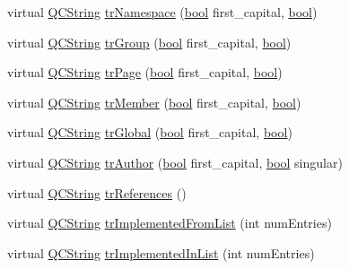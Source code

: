\begin{DoxyCompactItemize}
\item 
virtual \hyperlink{class_q_c_string}{Q\+C\+String} \hyperlink{class_translator_hungarian_a5251cff6b99f7682a9e735ae12f7548e}{tr\+Namespace} (\hyperlink{qglobal_8h_a1062901a7428fdd9c7f180f5e01ea056}{bool} first\+\_\+capital, \hyperlink{qglobal_8h_a1062901a7428fdd9c7f180f5e01ea056}{bool})
\item 
virtual \hyperlink{class_q_c_string}{Q\+C\+String} \hyperlink{class_translator_hungarian_a89dc6690b8c126f0573995077f5c7885}{tr\+Group} (\hyperlink{qglobal_8h_a1062901a7428fdd9c7f180f5e01ea056}{bool} first\+\_\+capital, \hyperlink{qglobal_8h_a1062901a7428fdd9c7f180f5e01ea056}{bool})
\item 
virtual \hyperlink{class_q_c_string}{Q\+C\+String} \hyperlink{class_translator_hungarian_ad8f96c9682cb2ced516615701264a06f}{tr\+Page} (\hyperlink{qglobal_8h_a1062901a7428fdd9c7f180f5e01ea056}{bool} first\+\_\+capital, \hyperlink{qglobal_8h_a1062901a7428fdd9c7f180f5e01ea056}{bool})
\item 
virtual \hyperlink{class_q_c_string}{Q\+C\+String} \hyperlink{class_translator_hungarian_a0c91ef506aa413a1d2bd034d9ce3fea1}{tr\+Member} (\hyperlink{qglobal_8h_a1062901a7428fdd9c7f180f5e01ea056}{bool} first\+\_\+capital, \hyperlink{qglobal_8h_a1062901a7428fdd9c7f180f5e01ea056}{bool})
\item 
virtual \hyperlink{class_q_c_string}{Q\+C\+String} \hyperlink{class_translator_hungarian_a3d388917e2cea7b7aa61b1c4dad1ba81}{tr\+Global} (\hyperlink{qglobal_8h_a1062901a7428fdd9c7f180f5e01ea056}{bool} first\+\_\+capital, \hyperlink{qglobal_8h_a1062901a7428fdd9c7f180f5e01ea056}{bool})
\item 
virtual \hyperlink{class_q_c_string}{Q\+C\+String} \hyperlink{class_translator_hungarian_aceb8864fd013ffb7092738c599d8d79e}{tr\+Author} (\hyperlink{qglobal_8h_a1062901a7428fdd9c7f180f5e01ea056}{bool} first\+\_\+capital, \hyperlink{qglobal_8h_a1062901a7428fdd9c7f180f5e01ea056}{bool} singular)
\item 
virtual \hyperlink{class_q_c_string}{Q\+C\+String} \hyperlink{class_translator_hungarian_a3b8e8265ab10b806370b32eac47034c3}{tr\+References} ()
\item 
virtual \hyperlink{class_q_c_string}{Q\+C\+String} \hyperlink{class_translator_hungarian_a45602139d6221a4be33d1da1adc01961}{tr\+Implemented\+From\+List} (int num\+Entries)
\item 
virtual \hyperlink{class_q_c_string}{Q\+C\+String} \hyperlink{class_translator_hungarian_ad3b492aa327f71075776a1fe991c6afa}{tr\+Implemented\+In\+List} (int num\+Entries)

\end{DoxyCompactItemize}
